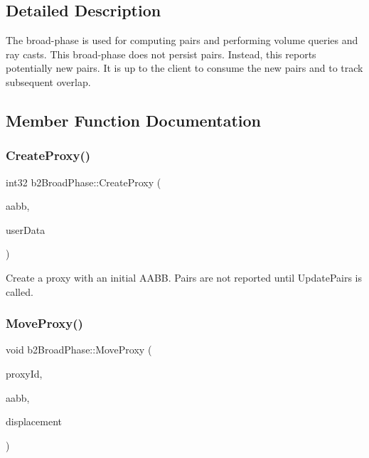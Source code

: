 \subsection{Detailed Description}
The broad-\/phase is used for computing pairs and performing volume queries and ray casts. This broad-\/phase does not persist pairs. Instead, this reports potentially new pairs. It is up to the client to consume the new pairs and to track subsequent overlap. 

\subsection{Member Function Documentation}
\mbox{\label{classb2BroadPhase_ae2f7af756bc55ece45221466c5af449c}} 
\subsubsection{\texorpdfstring{Create\+Proxy()}{CreateProxy()}}
{\footnotesize\ttfamily int32 b2\+Broad\+Phase\+::\+Create\+Proxy (\begin{DoxyParamCaption}\item[{const \mbox{\hyperlink{structb2AABB}{b2\+A\+A\+BB}} \&}]{aabb,  }\item[{void $\ast$}]{user\+Data }\end{DoxyParamCaption})}

Create a proxy with an initial A\+A\+BB. Pairs are not reported until Update\+Pairs is called. \mbox{\label{classb2BroadPhase_a01dc18a19c2b5d0cc1d9cd8c8554234c}} 
\subsubsection{\texorpdfstring{Move\+Proxy()}{MoveProxy()}}
{\footnotesize\ttfamily void b2\+Broad\+Phase\+::\+Move\+Proxy (\begin{DoxyParamCaption}\item[{int32}]{proxy\+Id,  }\item[{const \mbox{\hyperlink{structb2AABB}{b2\+A\+A\+BB}} \&}]{aabb,  }\item[{const \mbox{\hyperlink{structb2Vec2}{b2\+Vec2}} \&}]{displacement }\end{DoxyParamCaption})}

